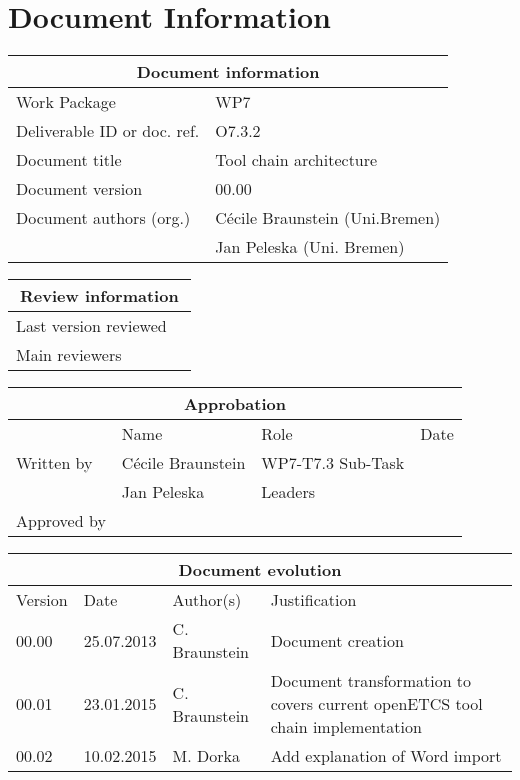 \documentclass{template/openetcs_report}
\begin{document}
\chapter{Document Information}
\begin{tabular}{|p{4.4cm}|p{8.7cm}|}
\hline
\multicolumn{2}{|c|}{Document information} \\
\hline
Work Package &  WP7  \\
Deliverable ID or doc. ref. & O7.3.2\\
\hline
Document title & Tool chain architecture \\
Document version & 00.00 \\
Document authors (org.)  & Cécile Braunstein  (Uni.Bremen)  \\
& Jan Peleska (Uni. Bremen)\\
\hline
\end{tabular}

\begin{tabular}{|p{4.4cm}|p{8.7cm}|}
\hline
\multicolumn{2}{|c|}{Review information} \\
\hline
Last version reviewed &  \\
\hline
Main reviewers & \\
\hline
\end{tabular}

\begin{tabular}{|p{2.2cm}|p{4cm}|p{4cm}|p{2cm}|}
\hline
\multicolumn{4}{|c|}{Approbation} \\
\hline
  &  Name & Role & Date   \\
\hline  
Written by    &  Cécile Braunstein & WP7-T7.3 Sub-Task  & \\
& Jan Peleska & Leaders&\\
\hline
Approved by & &  & \\
\hline
\end{tabular}

\begin{tabular}{|p{2.2cm}|p{2cm}|p{3cm}|p{5cm}|}
\hline
\multicolumn{4}{|c|}{Document evolution} \\
\hline
Version &  Date & Author(s) & Justification  \\
\hline  
00.00 & 25.07.2013 & C. Braunstein  &  Document creation  \\
00.01 & 23.01.2015 & C. Braunstein & Document transformation to covers
current openETCS tool chain implementation\\
00.02 & 10.02.2015 & M. Dorka & Add explanation of Word import\\
\hline  
\end{tabular}
\newpage
\end{document}
